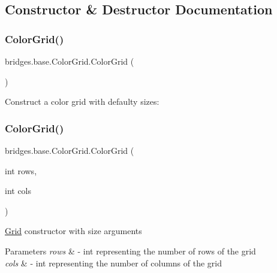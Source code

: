 \subsection{Constructor \& Destructor Documentation}
\mbox{\label{classbridges_1_1base_1_1_color_grid_af434a5a3dcbaf86e51ac6f9e1c1d7e5f}} 
\subsubsection{\texorpdfstring{ColorGrid()}{ColorGrid()}\hspace{0.1cm}{\footnotesize\ttfamily [1/3]}}
{\footnotesize\ttfamily bridges.\+base.\+Color\+Grid.\+Color\+Grid (\begin{DoxyParamCaption}{ }\end{DoxyParamCaption})}

Construct a color grid with defaulty sizes\+: \mbox{\label{classbridges_1_1base_1_1_color_grid_aafb4157a4c8129f30c1f989fcdfda544}} 
\subsubsection{\texorpdfstring{ColorGrid()}{ColorGrid()}\hspace{0.1cm}{\footnotesize\ttfamily [2/3]}}
{\footnotesize\ttfamily bridges.\+base.\+Color\+Grid.\+Color\+Grid (\begin{DoxyParamCaption}\item[{int}]{rows,  }\item[{int}]{cols }\end{DoxyParamCaption})}

\mbox{\hyperlink{classbridges_1_1base_1_1_grid}{Grid}} constructor with size arguments


\begin{DoxyParams}{Parameters}
{\em rows} & -\/ int representing the number of rows of the grid \\
\hline
{\em cols} & -\/ int representing the number of columns of the grid \\
\hline
\end{DoxyParams}
\mbox{\label{classbridges_1_1base_1_1_color_grid_aef40242c93b66ab851e6afa64cada0b5}} 
